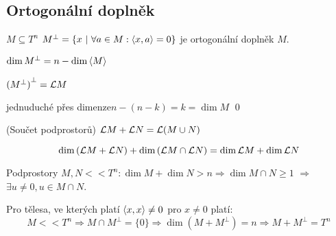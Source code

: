 \subsection{Ortogonální doplněk}


\df $M \subseteq T^n$ \quad $M^\bot = \{x\ |\ \forall a\in M: {\langle x,a\rangle} = 0\}$ je ortogonální doplněk $M$.

\poz $\dim M^\bot = n - \dim {\langle M\rangle}$

\poz ${(M^\bot)}^\bot = \mathcal{L} M$

\dk \uv{$\supseteq$} jednuduché \uv{$\subseteq$} přes dimenze\quad $n-(n-k) = k = \dim M$ \qed

\df (Součet podprostorů) $\mathcal{L} M + \mathcal{L} N = \mathcal{L}{(M\cup N)}$

\poz $$\dim\left(\mathcal{L} M + \mathcal{L} N\right) + \dim\left(\mathcal{L} M \cap \mathcal{L} N\right) = \dim \mathcal{L} M + \dim \mathcal{L} N$$

\dsl Podprostory $M,N << T^n: \dim M + \dim N > n \Rightarrow \dim M \cap N \ge 1$ $\Rightarrow$ $\exists u \neq 0, u \in M\cap N$.

\dsl Pro tělesa, ve kterých platí ${\langle x,x\rangle} \neq 0$ pro $x\neq 0$ platí:
$$M << T^n \Rightarrow M\cap M^\bot = \{0\} \Rightarrow \dim(M+M^\bot) = n \Rightarrow M + M^\bot = T^n$$

